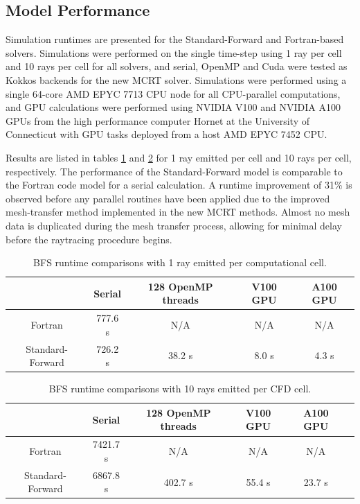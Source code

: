 \subsection{Model Performance}
Simulation runtimes are presented for the Standard-Forward and Fortran-based solvers. Simulations were performed on the single time-step using 1 ray per cell and 10 rays per cell for all solvers, and serial, OpenMP and Cuda were tested as Kokkos backends for the new MCRT solver. 
Simulations were performed using a single 64-core AMD EPYC 7713 CPU node for all CPU-parallel computations, and GPU calculations were performed using NVIDIA V100 and NVIDIA A100 GPUs from the high performance computer Hornet at the University of Connecticut with GPU tasks deployed from a host AMD EPYC 7452 CPU.


Results are listed in tables \ref{table:BFS_runtime_table_1rpc} and \ref{table:BFS_runtime_table_10rpc} for 1 ray emitted per cell and 10 rays per cell, respectively. The performance of the Standard-Forward model is comparable to the Fortran code model for a serial calculation. A runtime improvement of 31\% is observed before any parallel routines have been applied due to the improved mesh-transfer method implemented in the new MCRT methods. 
Almost no mesh data is duplicated during the mesh transfer process, allowing for minimal delay before the raytracing procedure begins.

\begin{table}
\centering
\caption{BFS runtime comparisons with 1 ray emitted per computational cell.}
\begin{tabular}{c c c c c} 
 \hline
  & Serial & 128 OpenMP threads & V100 GPU & A100 GPU \\ [0.5ex] 
 \hline %
 Fortran & 777.6 s &  N/A & N/A & N/A \\ 
 Standard-Forward & 726.2 s & 38.2 s & 8.0 s & 4.3 s \\
 \hline
\end{tabular}
\label{table:BFS_runtime_table_1rpc}
\end{table}

\begin{table}
\centering
\caption{BFS runtime comparisons with 10 rays emitted per CFD cell.}
\begin{tabular}{c c c c c c} 
 \hline
 & Serial & 128 OpenMP threads & V100 GPU & A100 GPU \\ [0.5ex] 
 \hline
 Fortran & 7421.7 s & N/A & N/A & N/A \\%
 Standard-Forward & 6867.8 s & 402.7 s & 55.4 s & 23.7 s \\%
 \hline
\end{tabular}
\label{table:BFS_runtime_table_10rpc}
\end{table}




